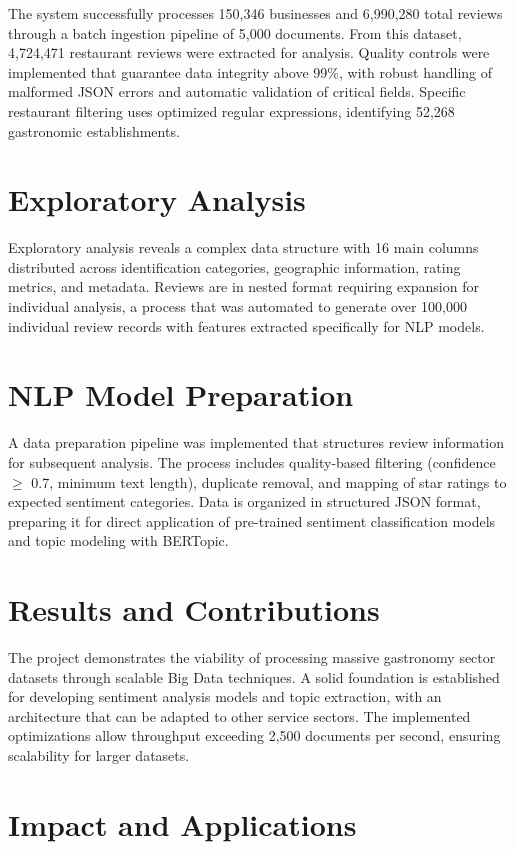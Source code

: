 \documentclass[12pt,a4paper,twoside,openany]{book}
\begin{document}
The system successfully processes 150,346 businesses and 6,990,280 total reviews through a batch ingestion pipeline of 5,000 documents. From this dataset, 4,724,471 restaurant reviews were extracted for analysis. Quality controls were implemented that guarantee data integrity above 99\%, with robust handling of malformed JSON errors and automatic validation of critical fields. Specific restaurant filtering uses optimized regular expressions, identifying 52,268 gastronomic establishments.

\section*{Exploratory Analysis}

Exploratory analysis reveals a complex data structure with 16 main columns distributed across identification categories, geographic information, rating metrics, and metadata. Reviews are in nested format requiring expansion for individual analysis, a process that was automated to generate over 100,000 individual review records with features extracted specifically for NLP models.

\section*{NLP Model Preparation}

A data preparation pipeline was implemented that structures review information for subsequent analysis. The process includes quality-based filtering (confidence $\geq$ 0.7, minimum text length), duplicate removal, and mapping of star ratings to expected sentiment categories. Data is organized in structured JSON format, preparing it for direct application of pre-trained sentiment classification models and topic modeling with BERTopic.

\section*{Results and Contributions}

The project demonstrates the viability of processing massive gastronomy sector datasets through scalable Big Data techniques. A solid foundation is established for developing sentiment analysis models and topic extraction, with an architecture that can be adapted to other service sectors. The implemented optimizations allow throughput exceeding 2,500 documents per second, ensuring scalability for larger datasets.

\section*{Impact and Applications}
\end{document}
